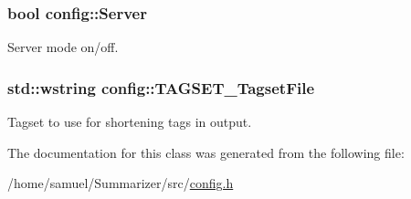 \subsubsection[{Server}]{\setlength{\rightskip}{0pt plus 5cm}bool config\+::\+Server}\label{classconfig_a8868de72bdafb627b21b7f20e16ebf9e}


Server mode on/off. 

\hypertarget{classconfig_a6f42f7c1c60685d9b223fa9dc717a947}{}
\subsubsection[{T\+A\+G\+S\+E\+T\+\_\+\+Tagset\+File}]{\setlength{\rightskip}{0pt plus 5cm}std\+::wstring config\+::\+T\+A\+G\+S\+E\+T\+\_\+\+Tagset\+File}\label{classconfig_a6f42f7c1c60685d9b223fa9dc717a947}


Tagset to use for shortening tags in output. 



The documentation for this class was generated from the following file\+:\begin{DoxyCompactItemize}
\item 
/home/samuel/\+Summarizer/src/\hyperlink{config_8h}{config.\+h}\end{DoxyCompactItemize}
